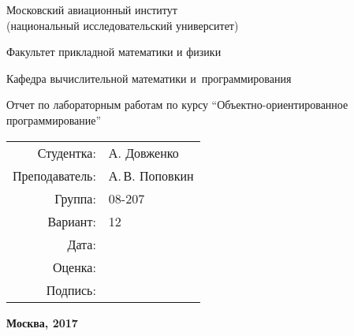 \begin{titlepage}
\begin{center}
\bfseries

{\Large Московский авиационный институт\\ (национальный исследовательский университет)

}

\vspace{48pt}

{\large Факультет прикладной математики и физики

}

\vspace{36pt}


{\large Кафедра вычислительной математики и~программирования

}


\vspace{48pt}

Отчет по лабораторным работам по курсу \enquote{Объектно-ориентированное программирование}

\end{center}

\vspace{72pt}

\begin{flushright}
\begin{tabular}{rl}
Студентка: & А. Довженко \\
Преподаватель: & А.\,В. Поповкин \\
Группа: & 08-207 \\
Вариант: & 12 \\
Дата: & \\
Оценка: & \\
Подпись: & \\
\end{tabular}
\end{flushright}

\vfill

\begin{center}
\bfseries
Москва, 2017
\end{center}
\end{titlepage}

\pagebreak